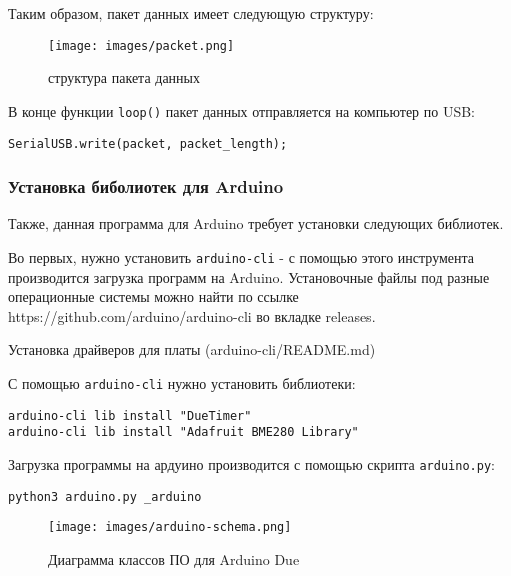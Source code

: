 \documentclass[../main.tex]{subfiles}
\begin{document}
Таким образом, пакет данных имеет следующую структуру:
\begin{figure}[H]
\centering
\texttt{[image: images/packet.png]}
\caption{структура пакета данных}
\end{figure}

В конце функции \verb|loop()| пакет данных отправляется на компьютер по USB:
\begin{lstlisting}
SerialUSB.write(packet, packet_length);
\end{lstlisting}

\subsubsection{Установка биболиотек для Arduino}

Также, данная программа для Arduino требует установки следующих библиотек. 

Во первых, нужно установить \texttt{arduino-cli} - с помощью этого инструмента производится загрузка программ на Arduino. Установочные файлы под разные операционные системы можно найти по ссылке https://github.com/arduino/arduino-cli во вкладке releases.

Установка драйверов для платы (arduino-cli/README.md)

С помощью \texttt{arduino-cli} нужно установить библиотеки:

\begin{lstlisting}
arduino-cli lib install "DueTimer"
arduino-cli lib install "Adafruit BME280 Library"
\end{lstlisting}


Загрузка программы на ардуино производится с помощью скрипта \texttt{arduino.py}:
\begin{lstlisting}
python3 arduino.py _arduino
\end{lstlisting}


\begin{figure}[H]
\centering
\texttt{[image: images/arduino-schema.png]}
\caption{Диаграмма классов ПО для Arduino Due}
\end{figure}

\newpage
\end{document}
